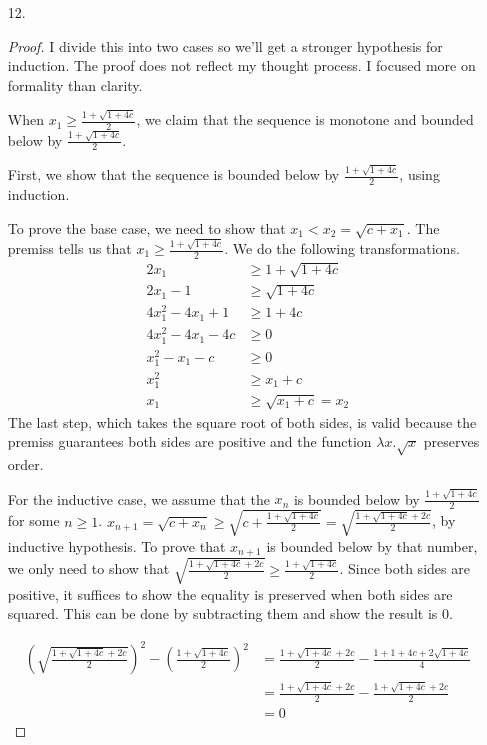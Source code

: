 \documentclass{article}
\begin{document}
\begin{enumerate}
  
\item [12.]
  \begin{proof}
    I divide this into two cases so we'll get a stronger
    hypothesis for induction. The proof does not reflect my thought
    process. I focused more on formality than clarity.

    When $x_1 \geq  \frac{1+\sqrt{1+4c}}{2}$, we claim that the
    sequence is monotone and bounded below by
    $\frac{1+\sqrt{1+4c}}{2}$.

    First, we show that the sequence is bounded below by
    $\frac{1+\sqrt{1+4c}}{2}$, using induction.

    To prove the base case, we need to show that $x_1 < x_2 = \sqrt{c
      + x_1}$. The premiss tells us that $x_1 \geq
    \frac{1+\sqrt{1+4c}}{2}$. We do the following transformations.
    \begin{equation} \label{eq0}
      \begin{split}
        2x_1 &\geq 1+ \sqrt{1+4c}\\
        2x_1 - 1 &\geq \sqrt{1+4c}\\
        4x_1^2 - 4x_1  + 1 &\geq 1+4c\\
        4x_1^2 - 4x_1 - 4c & \geq 0\\
        x_1^2 - x_1 -c &\geq 0\\
        x_1^2 &\geq x_1 + c\\
        x_1 &\geq \sqrt{x_1+c} = x_2
      \end{split}
    \end{equation}
    The last step, which takes the square root of both sides, is valid
    because the premiss guarantees both sides are positive and the function
    $\lambda x. \sqrt{x}$ preserves order.

    For the inductive case, we assume that the $x_n$ is bounded below
    by $\frac{1+\sqrt{1+4c}}{2}$ for some $n \geq 1$. $x_{n+1} =
    \sqrt{c+x_n} \geq \sqrt{c+\frac{1+\sqrt{1+4c}}{2}} = \sqrt{\frac{1+\sqrt{1+4c}+2c}{2}}$, by inductive
    hypothesis. To prove that $x_{n+1}$ is bounded below by that number,
    we only need to show that $\sqrt{\frac{1+\sqrt{1+4c}+2c}{2}} \geq
    \frac{1+\sqrt{1+4c}}{2}$. Since both sides are positive, it
    suffices to show the equality is preserved when both sides are squared. This can be done by
    subtracting them and show the result is $0$.

    \begin{equation} \label{eq1}
      \begin{split}
        (\sqrt{\frac{1+\sqrt{1+4c}+2c}{2}})^2 -
        (\frac{1+\sqrt{1+4c}}{2})^2 &= \frac{1 + \sqrt{1+4c}+2c}{2} -
        \frac{1+1+4c+2\sqrt{1+4c}}{4}
        \\
        &= \frac{1 + \sqrt{1+4c}+2c}{2} - \frac{1 + \sqrt{1+4c}+2c}{2}\\
        &= 0
      \end{split}
    \end{equation}


\end{proof}
\end{enumerate}
\end{document}

